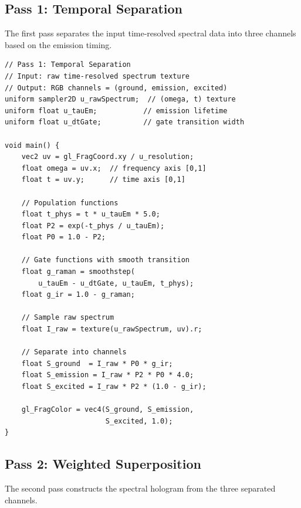 \documentclass[11pt,twocolumn,a4paper]{article}
\theoremstyle{definition}
\theoremstyle{remark}
\begin{document}
\subsection{Pass 1: Temporal Separation}

The first pass separates the input time-resolved spectral data into three channels based on the emission timing.

\begin{lstlisting}[style=glsl, caption={Pass 1: Temporal separation shader}, label={lst:pass1}]
// Pass 1: Temporal Separation
// Input: raw time-resolved spectrum texture
// Output: RGB channels = (ground, emission, excited)
uniform sampler2D u_rawSpectrum;  // (omega, t) texture
uniform float u_tauEm;           // emission lifetime
uniform float u_dtGate;          // gate transition width

void main() {
    vec2 uv = gl_FragCoord.xy / u_resolution;
    float omega = uv.x;  // frequency axis [0,1]
    float t = uv.y;      // time axis [0,1]

    // Population functions
    float t_phys = t * u_tauEm * 5.0;
    float P2 = exp(-t_phys / u_tauEm);
    float P0 = 1.0 - P2;

    // Gate functions with smooth transition
    float g_raman = smoothstep(
        u_tauEm - u_dtGate, u_tauEm, t_phys);
    float g_ir = 1.0 - g_raman;

    // Sample raw spectrum
    float I_raw = texture(u_rawSpectrum, uv).r;

    // Separate into channels
    float S_ground  = I_raw * P0 * g_ir;
    float S_emission = I_raw * P2 * P0 * 4.0;
    float S_excited = I_raw * P2 * (1.0 - g_ir);

    gl_FragColor = vec4(S_ground, S_emission,
                        S_excited, 1.0);
}
\end{lstlisting}

\subsection{Pass 2: Weighted Superposition}

The second pass constructs the spectral hologram from the three separated channels.
\end{document}
